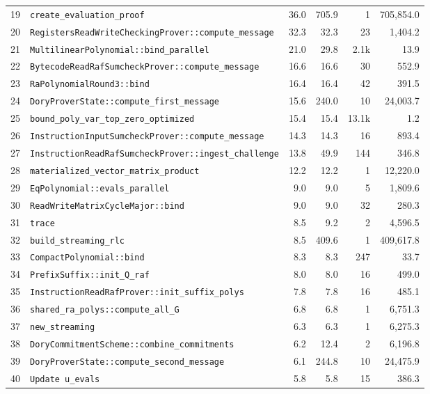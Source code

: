 \documentclass[10pt,a4paper]{article}
\begin{document}
\begin{longtable}{r l r r r r}
19 & \texttt{create\_evaluation\_proof} & 36.0 & 705.9 & 1 & 705,854.0 \\
20 & \texttt{RegistersReadWriteCheckingProver::compute\_message} & 32.3 & 32.3 & 23 & 1,404.2 \\
21 & \texttt{MultilinearPolynomial::bind\_parallel} & 21.0 & 29.8 & 2.1k & 13.9 \\
22 & \texttt{BytecodeReadRafSumcheckProver::compute\_message} & 16.6 & 16.6 & 30 & 552.9 \\
23 & \texttt{RaPolynomialRound3::bind} & 16.4 & 16.4 & 42 & 391.5 \\
24 & \texttt{DoryProverState::compute\_first\_message} & 15.6 & 240.0 & 10 & 24,003.7 \\
25 & \texttt{bound\_poly\_var\_top\_zero\_optimized} & 15.4 & 15.4 & 13.1k & 1.2 \\
26 & \texttt{InstructionInputSumcheckProver::compute\_message} & 14.3 & 14.3 & 16 & 893.4 \\
27 & \texttt{InstructionReadRafSumcheckProver::ingest\_challenge} & 13.8 & 49.9 & 144 & 346.8 \\
28 & \texttt{materialized\_vector\_matrix\_product} & 12.2 & 12.2 & 1 & 12,220.0 \\
29 & \texttt{EqPolynomial::evals\_parallel} & 9.0 & 9.0 & 5 & 1,809.6 \\
30 & \texttt{ReadWriteMatrixCycleMajor::bind} & 9.0 & 9.0 & 32 & 280.3 \\
31 & \texttt{trace} & 8.5 & 9.2 & 2 & 4,596.5 \\
32 & \texttt{build\_streaming\_rlc} & 8.5 & 409.6 & 1 & 409,617.8 \\
33 & \texttt{CompactPolynomial::bind} & 8.3 & 8.3 & 247 & 33.7 \\
34 & \texttt{PrefixSuffix::init\_Q\_raf} & 8.0 & 8.0 & 16 & 499.0 \\
35 & \texttt{InstructionReadRafProver::init\_suffix\_polys} & 7.8 & 7.8 & 16 & 485.1 \\
36 & \texttt{shared\_ra\_polys::compute\_all\_G} & 6.8 & 6.8 & 1 & 6,751.3 \\
37 & \texttt{new\_streaming} & 6.3 & 6.3 & 1 & 6,275.3 \\
38 & \texttt{DoryCommitmentScheme::combine\_commitments} & 6.2 & 12.4 & 2 & 6,196.8 \\
39 & \texttt{DoryProverState::compute\_second\_message} & 6.1 & 244.8 & 10 & 24,475.9 \\
40 & \texttt{Update u\_evals} & 5.8 & 5.8 & 15 & 386.3 \\
\bottomrule \end{longtable}
\end{document}

